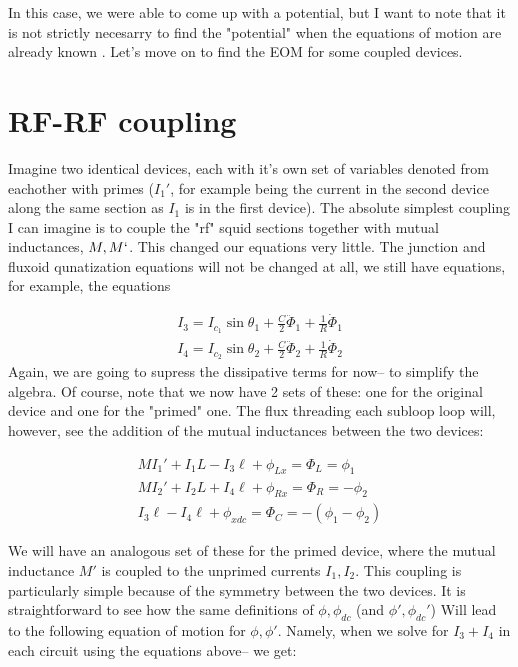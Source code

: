 \documentclass[paper=a4, twocolumn, fontsize=10pt]{article} %
\numberwithin{equation}{section} %
\numberwithin{figure}{section} %
\numberwithin{table}{section} %
\begin{document}
 In this case, we were able to come up with a potential, but I want to note that it is not strictly necesarry to find the "potential" when the equations of motion are already known . Let's move on to find the EOM for some coupled devices.


\section{ RF-RF coupling}

Imagine two identical devices, each with it's own set of variables denoted from eachother with primes ($I_1'$, for example being the current in the second device along the same section as $I_1$ is in the first device). The absolute simplest coupling I can imagine is to couple the "rf" squid sections together with mutual inductances, $M, M`$. This changed our equations very little. The junction and fluxoid qunatization equations will not be changed at all, we still have equations, for example, the equations

\begin{align}
    I_3 = I_{c_1} \sin \theta_1 + \frac{C}{2} \ddot{\Phi}_1 + \frac{1}{R} \dot{\Phi}_1
    \\ 
    I_4 = I_{c_2} \sin \theta_2 + \frac{C}{2} \ddot{\Phi}_2 + \frac{1}{R} \dot{\Phi}_2
    \end{align} 
Again, we are going to supress the dissipative terms for now-- to simplify the algebra. Of course, note that we now have 2 sets of these: one for the original device and one for the "primed" one.  The flux threading each subloop loop will, however, see the addition of the mutual inductances between the two devices:

\begin{align}
    MI_1' + I_1 L - I_3 \ell + \phi_{Lx} = \Phi_{L} = \phi_1
    \\
    MI_2' + I_2 L + I_4 \ell + \phi_{Rx} = \Phi_{R} = -\phi_2
    \\
    I_3 \ell - I_4 \ell + \phi_{xdc} = \Phi_{C} = -(\phi_1 - \phi_2)
\end{align} 

We will have an analogous set of these for the primed device, where the mutual inductance $M'$ is coupled to the unprimed currents $I_1, I_2$. This coupling is particularly simple because of the symmetry between the two devices. It is straightforward to see how the same definitions of $\phi,\phi_{dc}$ (and $\phi',\phi_{dc}'$) Will lead to the following equation of motion for $\phi,\phi'$. Namely, when we solve for $I_3+I_4$ in each circuit using the equations above-- we get:
\end{document}
